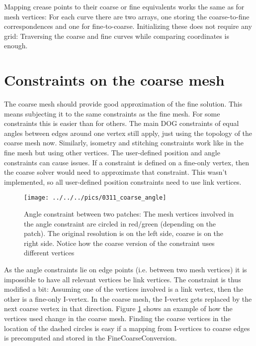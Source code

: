 \documentclass[a4paper,twoside,12pt,nochapterprefix]{scrbook}
\begin{document}
Mapping crease points to their coarse or fine equivalents works the same as for mesh vertices: For each curve there are two arrays, one storing the coarse-to-fine correspondences and one for fine-to-coarse. Initializing these does not require any grid: Traversing the coarse and fine curves while comparing coordinates is enough.\newline%
\section{Constraints on the coarse mesh}\label{sec:coarse_constraints}
The coarse mesh should provide good approximation of the fine solution. This means subjecting it to the same constraints as the fine mesh. For some constraints this is easier than for others.\newline
The main DOG constraints of equal angles between edges around one vertex still apply, just using the topology of the coarse mesh now. Similarly, isometry and stitching constraints work like in the fine mesh but using other vertices.\newline
The user-defined position and angle constraints can cause issues. If a constraint is defined on a fine-only vertex, then the coarse solver would need to approximate that constraint. This wasn't implemented, so all user-defined position constraints need to use link vertices.\newline
\begin{figure}
    \centering
    \texttt{[image: ../../../pics/0311\_coarse\_angle]}
    \caption{Angle constraint between two patches: The mesh vertices involved in the angle constraint are circled in red/green (depending on the patch). The original resolution is on the left side, coarse is on the right side. Notice how the coarse version of the constraint uses different vertices}
      \label{fig:angleconstraint_ftc}
\end{figure}
As the angle constraints lie on edge points (i.e. between two mesh vertices) it is impossible to have all relevant vertices be link vertices. The constraint is thus modified a bit: Assuming one of the vertices involved is a link vertex, then the other is a fine-only I-vertex. In the coarse mesh, the I-vertex gets replaced by the next coarse vertex in that direction. Figure \ref{fig:angleconstraint_ftc} shows an example of how the vertices used change in the coarse mesh. Finding the coarse vertices in the location of the dashed circles is easy if a mapping from I-vertices to coarse edges is precomputed and stored in the FineCoarseConversion.\newline
\end{document}
